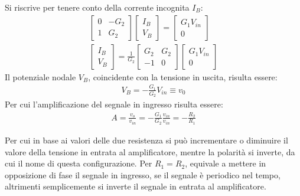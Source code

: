\documentclass{article}
\numberwithin{equation}{subsection}
\begin{document}
Si riscrive per tenere conto della corrente incognita $I_B$:
\begin{gather*}
    \begin{bmatrix}
        0&-G_2\\1&G_2
    \end{bmatrix}\begin{bmatrix}
        I_B\\V_{B}
    \end{bmatrix}=\begin{bmatrix}
        G_1V_{in}\\0
    \end{bmatrix}\\
    \begin{bmatrix}
        I_B\\V_B
    \end{bmatrix}=\displaystyle\frac{1}{G_2}\begin{bmatrix}
        G_2&G_2\\-1&0
    \end{bmatrix}\begin{bmatrix}
        G_1V_{in}\\0
    \end{bmatrix}
\end{gather*}
Il potenziale nodale $V_B$, coincidente con la tensione in uscita, risulta essere:
\begin{gather*}
    V_B=-\displaystyle\frac{G_1}{G_2}V_{in}\equiv v_0
\end{gather*}
Per cui l'amplificazione del segnale in ingresso risulta essere:
\begin{gather*}
    A=\displaystyle\frac{v_o}{v_{in}}=-\frac{G_1}{G_2}\frac{v_{in}}{v_{in}}=-\frac{R_2}{R_1}
\end{gather*}

Per cui in base ai valori delle due resistenza si può incrementare o diminuire il valore della tensione in entrata al amplificatore, mentre 
la polarità si inverte, da cui il nome di questa configurazione. 
Per $R_1=R_2$, equivale a mettere in opposizione di fase il segnale in ingresso, se il segnale è periodico nel tempo, altrimenti semplicemente 
si inverte il segnale in entrata al amplificatore. 
\end{document}
